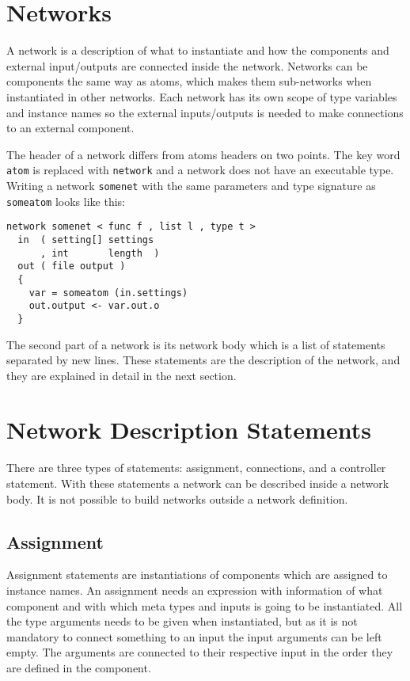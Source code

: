 \section{Networks}\label{sec:net}
A network is a description of what to instantiate and how the
components and external input/outputs are connected inside the
network. Networks can be components the same way as atoms, which makes
them sub-networks when instantiated in other networks. Each network has
its own scope of type variables and instance names so the external
inputs/outputs is needed to make connections to an external component.

The header of a network differs from atoms headers on two points. The
key word \verb#atom# is replaced with \verb#network# and a network
does not have an executable type. Writing a network \verb#somenet#
with the same parameters and type signature as \verb#someatom# looks
like this:

\begin{verbatim}
network somenet < func f , list l , type t >
  in  ( setting[] settings
      , int       length  )
  out ( file output )
  {
    var = someatom (in.settings)
    out.output <- var.out.o
  }
\end{verbatim}

The second part of a network is its network body which is a list of
statements separated by new lines. These statements are the
description of the network, and they are explained in detail in the
next section.


\section{Network Description Statements} \label{sec:stmt}
There are three types of statements: assignment, connections, and a
controller statement. With these statements a network can be described
inside a network body. It is not possible to build networks outside a
network definition.


\subsection{Assignment}
Assignment statements are instantiations of components which are
assigned to instance names. An assignment needs an expression with
information of what component and with which meta types and inputs is
going to be instantiated. All the type arguments needs to be given
when instantiated, but as it is not mandatory to connect something to
an input the input arguments can be left empty. The arguments are
connected to their respective input in the order they are defined in
the component.

